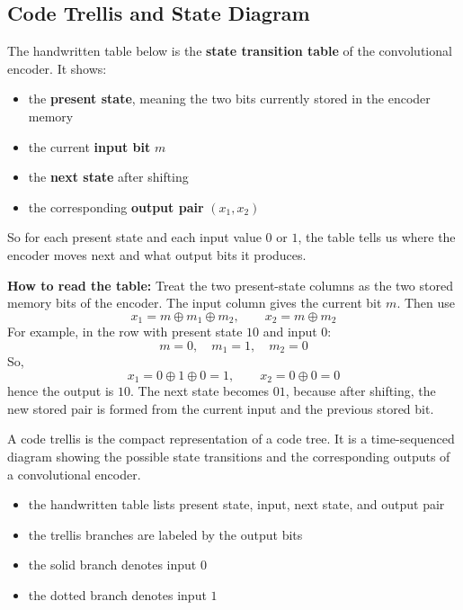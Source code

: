 \documentclass[11pt,a4paper]{book}
\newenvironment{definitionbox}[1][Definition]{%
    \begin{tcolorbox}[
        enhanced,
        breakable,
        colback=primaryblue!10,
        colframe=primaryblue!150,
        title=#1,
        fonttitle=\bfseries,
        sharp corners,
        boxrule=0.8pt,
        left=8pt,
        right=8pt,
        top=6pt,
        bottom=6pt
    ]
}{\end{tcolorbox}}
\newenvironment{infobox}[1][Information]{%
    \begin{tcolorbox}[
        enhanced,
        breakable,
        colback=mintgreen!10,
        colframe=mintgreen!200,
        title=#1,
        fonttitle=\bfseries,
        sharp corners,
        boxrule=0.8pt,
        left=8pt,
        right=8pt,
        top=6pt,
        bottom=6pt
    ]
}{\end{tcolorbox}}
\begin{document}
\subsection{Code Trellis and State Diagram}

\begin{infobox}[State Transition Table]
The handwritten table below is the \textbf{state transition table} of the convolutional encoder. It shows:
\begin{itemize}
    \item the \textbf{present state}, meaning the two bits currently stored in the encoder memory
    \item the current \textbf{input bit} \(m\)
    \item the \textbf{next state} after shifting
    \item the corresponding \textbf{output pair} \((x_1,x_2)\)
\end{itemize}
So for each present state and each input value \(0\) or \(1\), the table tells us where the encoder moves next and what output bits it produces.
\end{infobox}

\textbf{How to read the table:}
Treat the two present-state columns as the two stored memory bits of the encoder. The input column gives the current bit \(m\). Then use
\[
x_1=m\oplus m_1\oplus m_2,\qquad x_2=m\oplus m_2
\]
For example, in the row with present state \(10\) and input \(0\):
\[
m=0,\quad m_1=1,\quad m_2=0
\]
So,
\[
x_1=0\oplus1\oplus0=1,\qquad x_2=0\oplus0=0
\]
hence the output is \(10\). The next state becomes \(01\), because after shifting, the new stored pair is formed from the current input and the previous stored bit.



\begin{definitionbox}[Code Trellis]
A code trellis is the compact representation of a code tree. It is a time-sequenced diagram showing the possible state transitions and the corresponding outputs of a convolutional encoder.
\end{definitionbox}

\begin{infobox}[Reading the Handwritten Trellis]
\begin{itemize}
    \item the handwritten table lists present state, input, next state, and output pair
    \item the trellis branches are labeled by the output bits
    \item the solid branch denotes input \(0\)
    \item the dotted branch denotes input \(1\)
\end{itemize}
\end{infobox}
\end{document}
